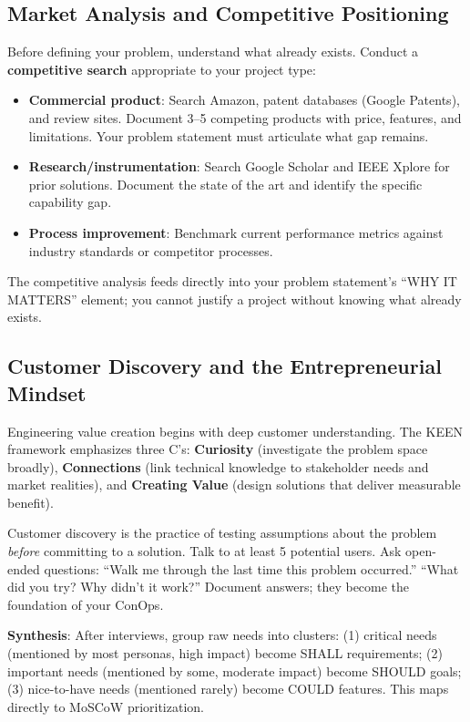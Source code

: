 \documentclass[11pt,letterpaper,twoside,openany]{book}
\begin{document}
\subsection{Market Analysis and Competitive Positioning}
Before defining your problem, understand what already exists. Conduct a \textbf{competitive search} appropriate to your project type:

\begin{itemize}[leftmargin=1.5em]
\item \textbf{Commercial product}: Search Amazon, patent databases (Google Patents), and review sites. Document 3--5 competing products with price, features, and limitations. Your problem statement must articulate what gap remains.
\item \textbf{Research/instrumentation}: Search Google Scholar and IEEE Xplore for prior solutions. Document the state of the art and identify the specific capability gap.
\item \textbf{Process improvement}: Benchmark current performance metrics against industry standards or competitor processes.
\end{itemize}

The competitive analysis feeds directly into your problem statement's ``WHY IT MATTERS'' element; you cannot justify a project without knowing what already exists.

\subsection{Customer Discovery and the Entrepreneurial Mindset}
Engineering value creation begins with deep customer understanding. The KEEN framework emphasizes three C's: \textbf{Curiosity} (investigate the problem space broadly), \textbf{Connections} (link technical knowledge to stakeholder needs and market realities), and \textbf{Creating Value} (design solutions that deliver measurable benefit).

Customer discovery is the practice of testing assumptions about the problem \emph{before} committing to a solution. Talk to at least 5 potential users. Ask open-ended questions: ``Walk me through the last time this problem occurred.'' ``What did you try? Why didn't it work?'' Document answers; they become the foundation of your ConOps.

\textbf{Synthesis}: After interviews, group raw needs into clusters: (1) critical needs (mentioned by most personas, high impact) become SHALL requirements; (2) important needs (mentioned by some, moderate impact) become SHOULD goals; (3) nice-to-have needs (mentioned rarely) become COULD features. This maps directly to MoSCoW prioritization.
\end{document}
